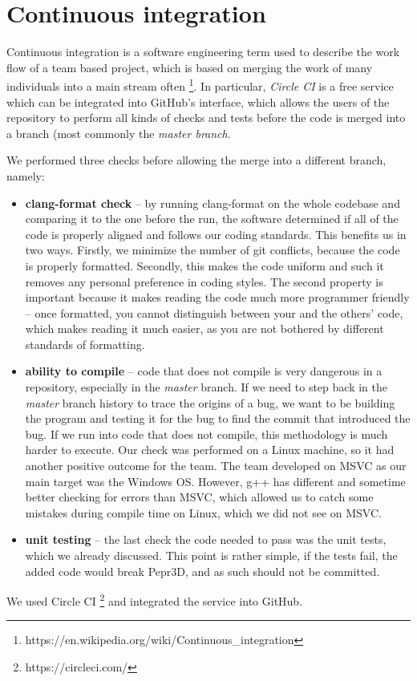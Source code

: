 \section{Continuous integration}

Continuous integration is a software engineering term used to describe the work flow of a team based project, which is based on merging the work of many individuals into a main stream often \footnote{https://en.wikipedia.org/wiki/Continuous\_integration}. In particular, \textit{Circle CI} is a free service which can be integrated into GitHub's interface, which allows the users of the repository to perform all kinds of checks and tests before the code is merged into a branch (most commonly the \textit{master branch}.

We performed three checks before allowing the merge into a different branch, namely:

\begin{itemize}
\item \textbf{clang-format check} -- by running clang-format on the whole codebase and comparing it to the one before the run, the software determined if all of the code is properly aligned and follows our coding standards. This benefits us in two ways. Firstly, we minimize the number of git conflicts, because the code is properly formatted. Secondly, this makes the code uniform and such it removes any personal preference in coding styles. The second property is important because it makes reading the code much more programmer friendly -- once formatted, you cannot distinguish between your and the others' code, which makes reading it much easier, as you are not bothered by different standards of formatting.

\item \textbf{ability to compile} -- code that does not compile is very dangerous in a repository, especially in the \textit{master} branch. If we need to step back in the \textit{master} branch history to trace the origins of a bug, we want to be building the program and testing it for the bug to find the commit that introduced the bug. If we run into code that does not compile, this methodology is much harder to execute. Our check was performed on a Linux machine, so it had another positive outcome for the team. The team developed on MSVC as our main target was the Windows OS. However, g++ has different and sometime better checking for errors than MSVC, which allowed us to catch some mistakes during compile time on Linux, which we did not see on MSVC.

\item \textbf{unit testing} -- the last check the code needed to pass was the unit tests, which we already discussed. This point is rather simple, if the tests fail, the added code would break Pepr3D, and as such should not be committed.

\end{itemize}

We used Circle CI \footnote{https://circleci.com/} and integrated the service into GitHub.